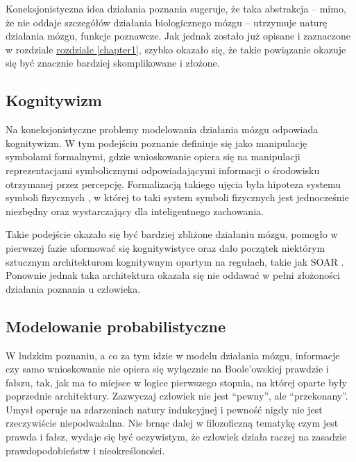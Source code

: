 Koneksjonistyczna idea działania poznania sugeruje, że taka abstrakcja -- mimo, że nie oddaje szczegółów działania biologicznego mózgu -- utrzymuje naturę działania mózgu, funkcje poznawcze.
Jak jednak zostało już opisane i zaznaczone w rozdziale \hyperref[chapter1]{rozdziale \ref*{chapter1}}, szybko okazało się, że takie powiązanie okazuje się być znacznie bardziej skomplikowane i złożone.

\subsection{Kognitywizm}

Na koneksjonistyczne problemy modelowania działania mózgu odpowiada kognitywizm.
W tym podejściu poznanie definiuje się jako manipulację symbolami formalnymi, gdzie wnioskowanie opiera się na manipulacji reprezentacjami symbolicznymi odpowiadającymi informacji o środowisku otrzymanej przez percepcję.
Formalizacją takiego ujęcia była hipoteza systemu symboli fizycznych \cite{newell1981computer}, w której to taki system symboli fizycznych jest jednocześnie niezbędny oraz wystarczający dla inteligentnego zachowania.

Takie podejście okazało się być bardziej zbliżone działaniu mózgu, pomogło w pierwszej fazie uformować się kognitywistyce oraz dało początek niektórym sztucznym architekturom kognitywnym opartym na regułach, takie jak SOAR \cite{laird2019soar}\footnotemark.
Ponownie jednak taka architektura okazała się nie oddawać w pełni złożoności działania poznania u człowieka.

\subsection{Modelowanie probabilistyczne}

W ludzkim poznaniu, a co za tym idzie w modelu działania mózgu, informacje czy samo wnioskowanie nie opiera się wyłącznie na Boole'owskiej prawdzie i fałszu, tak, jak ma to miejsce w logice pierwszego stopnia, na której oparte były poprzednie architektury.
Zazwyczaj człowiek nie jest ``pewny'', ale ``przekonany''.
Umysł operuje na zdarzeniach natury indukcyjnej i pewność nigdy nie jest rzeczywiście niepodważalna.
Nie brnąc dalej w filozoficzną tematykę czym jest prawda i fałsz, wydaje się być oczywistym, że człowiek działa raczej na zasadzie prawdopodobieństw i nieokreśloności.

